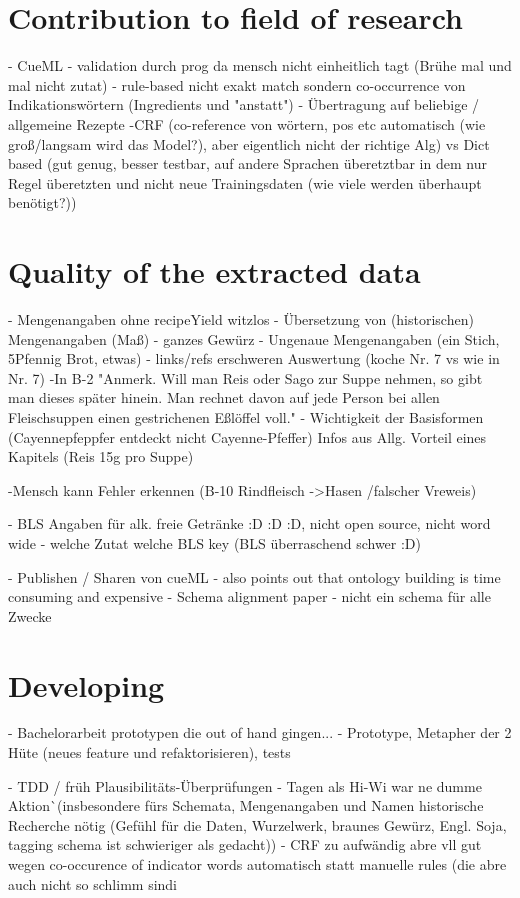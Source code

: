 \documentclass[12pt, twoside]{report}
\begin{document}
\section{Contribution to field of research}
- CueML
	- validation durch prog da mensch nicht einheitlich tagt (Brühe mal und mal nicht zutat)
- rule-based nicht exakt match sondern co-occurrence von Indikationswörtern (Ingredients und "anstatt")
- Übertragung auf beliebige / allgemeine Rezepte
-CRF (co-reference von wörtern, pos etc automatisch (wie groß/langsam wird das Model?), aber eigentlich nicht der richtige Alg) vs Dict based (gut genug, besser testbar, auf andere Sprachen überetztbar in dem nur Regel überetzten und nicht neue Trainingsdaten (wie viele werden überhaupt benötigt?))


\section{Quality of the extracted data}
- Mengenangaben ohne recipeYield witzlos
- Übersetzung von (historischen) Mengenangaben (Maß)
- ganzes Gewürz
- Ungenaue Mengenangaben (ein Stich, 5Pfennig Brot, etwas)
- links/refs erschweren Auswertung (koche Nr. 7 vs wie in Nr. 7)
-In B-2 "Anmerk. Will man Reis oder Sago zur Suppe nehmen, so gibt man dieses später
hinein. Man rechnet davon auf jede Person bei allen Fleischsuppen einen gestrichenen Eßlöffel voll."
- Wichtigkeit der Basisformen (Cayennepfeppfer entdeckt nicht Cayenne-Pfeffer)
Infos aus Allg. Vorteil eines Kapitels (Reis 15g pro Suppe)

-Mensch kann Fehler erkennen (B-10 Rindfleisch ->Hasen /falscher Vreweis)

- BLS Angaben für alk. freie Getränke :D :D :D, nicht open source, nicht word wide
- welche Zutat welche BLS key (BLS überraschend schwer :D)

- Publishen / Sharen von cueML
	- \parencite{GrammaBased} also points out that ontology building is time consuming and expensive
	- Schema alignment paper - nicht ein schema für alle Zwecke

\section{Developing}
- Bachelorarbeit prototypen die out of hand gingen...
- Prototype, Metapher der 2 Hüte (neues feature und refaktorisieren), tests

- TDD / früh Plausibilitäts-Überprüfungen - Tagen als Hi-Wi war ne dumme Aktion^^ (insbesondere fürs Schemata, Mengenangaben und Namen historische Recherche nötig (Gefühl für die Daten, Wurzelwerk, braunes Gewürz,	Engl. Soja, tagging schema ist schwieriger als gedacht))
- CRF zu aufwändig abre vll gut wegen co-occurence of indicator words automatisch statt manuelle rules (die abre auch nicht so schlimm sind^^)
\end{document}
